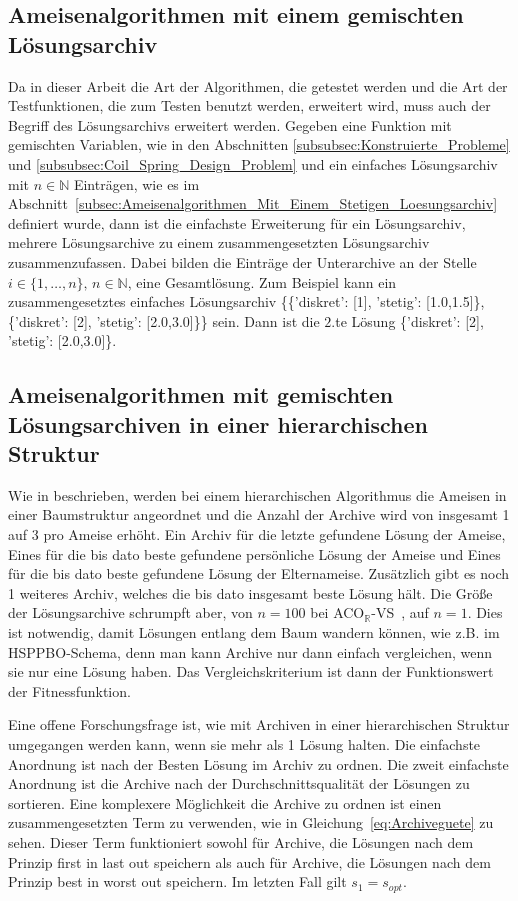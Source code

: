 \documentclass[fontsize=12, a4aper]{scrartcl}
\begin{document}
	\subsection{Ameisenalgorithmen mit einem gemischten Lösungsarchiv}
	
	Da in dieser Arbeit die Art der Algorithmen, die getestet werden und die Art der Testfunktionen, die zum Testen benutzt werden, erweitert wird, muss auch der Begriff des Lösungsarchivs erweitert werden. Gegeben eine Funktion mit gemischten Variablen, wie in den Abschnitten \ref{subsubsec:Konstruierte_Probleme} und \ref{subsubsec:Coil_Spring_Design_Problem} und ein einfaches Lösungsarchiv mit \(n \in \mathbb{N}\) Einträgen, wie es im Abschnitt~\ref{subsec:Ameisenalgorithmen_Mit_Einem_Stetigen_Loesungsarchiv} definiert wurde, dann ist die einfachste Erweiterung für ein Lösungsarchiv, mehrere Lösungsarchive zu einem zusammengesetzten Lösungsarchiv zusammenzufassen. Dabei bilden die Einträge der Unterarchive an der Stelle \(i \in \{1, \dots, n\}, \, n \in \mathbb{N}\), eine Gesamtlösung. Zum Beispiel kann ein zusammengesetztes einfaches Lösungsarchiv \{\{'diskret': [1], 'stetig': [1.0,1.5]\}, \{'diskret': [2], 'stetig': [2.0,3.0]\}\} sein. Dann ist die \(2.\)te Lösung \{'diskret': [2], 'stetig': [2.0,3.0]\}.
	
	\subsection{Ameisenalgorithmen mit gemischten Lösungsarchiven in einer hierarchischen Struktur}
	
	Wie in \cite{kupfer2021hierarchical} beschrieben, werden bei einem hierarchischen Algorithmus die Ameisen in einer Baumstruktur angeordnet und die Anzahl der Archive wird von insgesamt 1 auf 3 pro Ameise erhöht. Ein Archiv für die letzte gefundene Lösung der Ameise, Eines für die bis dato beste gefundene persönliche Lösung der Ameise und Eines für die bis dato beste gefundene Lösung der Elternameise. Zusätzlich gibt es noch 1 weiteres Archiv, welches die bis dato insgesamt beste Lösung hält. Die Größe der Lösungsarchive schrumpft aber, von \(n = 100\) bei ACO\(_\mathbb{R}\)-VS~\cite{FCM_2019}, auf \(n = 1\). Dies ist notwendig, damit Lösungen entlang dem Baum wandern können, wie z.B. im HSPPBO-Schema, denn man kann Archive nur dann einfach vergleichen, wenn sie nur eine Lösung haben. Das Vergleichskriterium ist dann der Funktionswert der Fitnessfunktion.\hfill\newline
	
	Eine offene Forschungsfrage ist, wie mit Archiven in einer hierarchischen Struktur umgegangen werden kann, wenn sie mehr als 1 Lösung halten. Die einfachste Anordnung ist nach der Besten Lösung im Archiv zu ordnen. Die zweit einfachste Anordnung ist die Archive nach der Durchschnittsqualität der Lösungen zu sortieren. Eine komplexere Möglichkeit die Archive zu ordnen ist einen zusammengesetzten Term zu verwenden, wie in Gleichung~\ref{eq:Archiveguete} zu sehen. Dieser Term funktioniert sowohl für Archive, die Lösungen nach dem Prinzip \glqq first in last out\grqq{} speichern als auch für Archive, die Lösungen nach dem Prinzip \glqq best in worst out\grqq{} speichern. Im letzten Fall gilt \(s_1 = s_{opt}\).
	
\end{document}
